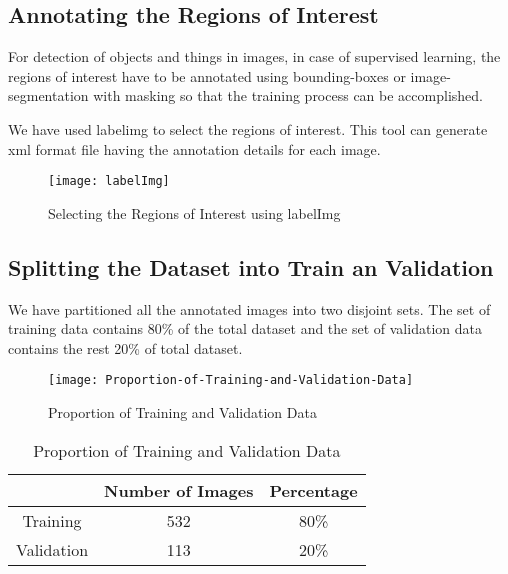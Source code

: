         \clearpage
        \subsection{Annotating the Regions of Interest}
            For detection of objects and things in images, in case of supervised learning, the regions of interest have to be annotated using bounding-boxes or image-segmentation with masking so that the training process can be accomplished.
            
            We have used \gls{labelimg} to select the regions of interest. This tool can generate \acrfull{xml} format file having the annotation details for each image.
        
            \begin{figure}[h]
                \centering
                \texttt{[image: labelImg]}
                \caption{Selecting the Regions of Interest using labelImg}
                \label{fig:labelImg}
            \end{figure}
            
        \subsection{Splitting the Dataset into Train an Validation}
            We have partitioned all the annotated images into two disjoint sets. The set of training data contains 80\% of the total dataset and the set of validation data contains the rest 20\% of total dataset.
            
            \begin{figure}
                \centering
                \texttt{[image: Proportion-of-Training-and-Validation-Data]}
                \caption{Proportion of Training and Validation Data}
                \label{fig:train_test_proportion}
            \end{figure}
        
            \begin{table}
                \centering
                \begin{tabular}{|c|c|c|} \hline
                     &  Number of Images & Percentage \\\hline\hline
                    Training & 532 & 80\% \\\hline
                    Validation & 113 & 20\% \\\hline
                \end{tabular}
                \caption{Proportion of Training and Validation Data}
                \label{tab:train_test_proportion}
            \end{table}
            
